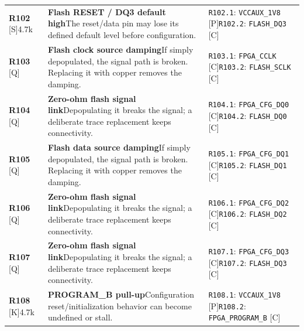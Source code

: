 \documentclass[11pt,a4paper]{article}
\begin{document}
\begin{longtable}{@{}P{27mm}P{77mm}P{62mm}@{}}
\textbf{R102} [S]\newline 4.7k & \textbf{Flash RESET / DQ3 default high}\newline The reset/data pin may lose its defined default level before configuration. & \nolinkurl{R102.1}: \nolinkurl{VCCAUX_1V8} [P]\newline \nolinkurl{R102.2}: \nolinkurl{FLASH_DQ3} [C] \\
\textbf{R103} [Q] & \textbf{Flash clock source damping}\newline If simply depopulated, the signal path is broken. Replacing it with copper removes the damping. & \nolinkurl{R103.1}: \nolinkurl{FPGA_CCLK} [C]\newline \nolinkurl{R103.2}: \nolinkurl{FLASH_SCLK} [C] \\
\textbf{R104} [Q] & \textbf{Zero-ohm flash signal link}\newline Depopulating it breaks the signal; a deliberate trace replacement keeps connectivity. & \nolinkurl{R104.1}: \nolinkurl{FPGA_CFG_DQ0} [C]\newline \nolinkurl{R104.2}: \nolinkurl{FLASH_DQ0} [C] \\
\textbf{R105} [Q] & \textbf{Flash data source damping}\newline If simply depopulated, the signal path is broken. Replacing it with copper removes the damping. & \nolinkurl{R105.1}: \nolinkurl{FPGA_CFG_DQ1} [C]\newline \nolinkurl{R105.2}: \nolinkurl{FLASH_DQ1} [C] \\
\textbf{R106} [Q] & \textbf{Zero-ohm flash signal link}\newline Depopulating it breaks the signal; a deliberate trace replacement keeps connectivity. & \nolinkurl{R106.1}: \nolinkurl{FPGA_CFG_DQ2} [C]\newline \nolinkurl{R106.2}: \nolinkurl{FLASH_DQ2} [C] \\
\textbf{R107} [Q] & \textbf{Zero-ohm flash signal link}\newline Depopulating it breaks the signal; a deliberate trace replacement keeps connectivity. & \nolinkurl{R107.1}: \nolinkurl{FPGA_CFG_DQ3} [C]\newline \nolinkurl{R107.2}: \nolinkurl{FLASH_DQ3} [C] \\
\textbf{R108} [K]\newline 4.7k & \textbf{PROGRAM\_B pull-up}\newline Configuration reset/initialization behavior can become undefined or stall. & \nolinkurl{R108.1}: \nolinkurl{VCCAUX_1V8} [P]\newline \nolinkurl{R108.2}: \nolinkurl{FPGA_PROGRAM_B} [C] \\

\end{longtable}
\end{document}
